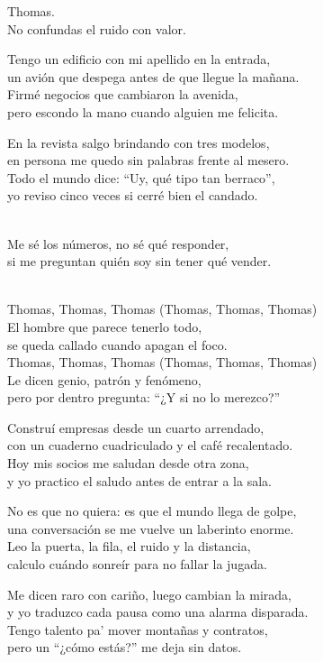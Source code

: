 \begin{lyrics}
Thomas.\\
No confundas el ruido con valor.

Tengo un edificio con mi apellido en la entrada,\\
un avión que despega antes de que llegue la mañana.\\
Firmé negocios que cambiaron la avenida,\\
pero escondo la mano cuando alguien me felicita.

En la revista salgo brindando con tres modelos,\\
en persona me quedo sin palabras frente al mesero.\\
Todo el mundo dice: “Uy, qué tipo tan berraco”,\\
yo reviso cinco veces si cerré bien el candado.

\\
Me sé los números, no sé qué responder,\\
si me preguntan quién soy sin tener qué vender.

\\
Thomas, Thomas, Thomas
(Thomas, Thomas, Thomas)\\
El hombre que parece tenerlo todo,\\
se queda callado cuando apagan el foco.\\
Thomas, Thomas, Thomas
(Thomas, Thomas, Thomas)\\
Le dicen genio, patrón y fenómeno,\\
pero por dentro pregunta: “¿Y si no lo merezco?”

Construí empresas desde un cuarto arrendado,\\
con un cuaderno cuadriculado y el café recalentado.\\
Hoy mis socios me saludan desde otra zona,\\
y yo practico el saludo antes de entrar a la sala.

No es que no quiera: es que el mundo llega de golpe,\\
una conversación se me vuelve un laberinto enorme.\\
Leo la puerta, la fila, el ruido y la distancia,\\
calculo cuándo sonreír para no fallar la jugada.

Me dicen raro con cariño, luego cambian la mirada,\\
y yo traduzco cada pausa como una alarma disparada.\\
Tengo talento pa’ mover montañas y contratos,\\
pero un “¿cómo estás?” me deja sin datos.


\end{lyrics}
